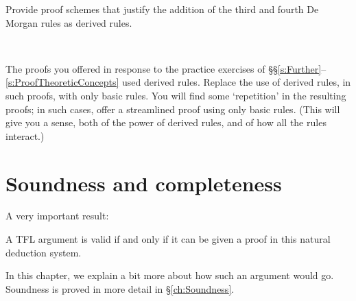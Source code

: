 \begin{practiceproblems}

\problempart
Provide proof schemes that justify the addition of the third and fourth De Morgan rules as derived rules.

\

\problempart
The proofs you offered in response to the practice exercises of \S\S\ref{s:Further}--\ref{s:ProofTheoreticConcepts} used derived rules. Replace the use of derived rules, in such proofs, with only basic rules. You will find some `repetition' in the resulting proofs; in such cases, offer a streamlined proof using only basic rules.  (This will give you a sense, both of the power of derived rules, and of how all the rules interact.)

\end{practiceproblems}

\chapter{Soundness and completeness}
\label{sec:soundness_and_completeness}\nonexaminable

A very important result:
\begin{highlighted}
A TFL argument is valid if and only if it can be given a proof in this natural deduction system.
\end{highlighted}
In this chapter, we explain a bit more about how such an argument would go. Soundness is proved in more detail in \S\ref{ch:Soundness}.



